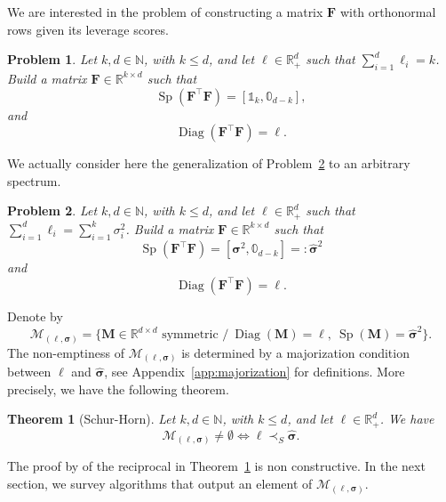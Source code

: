 \documentclass[twoside,11pt]{book}
\newtheorem{theorem}{Theorem}
\newtheorem{problem}{Problem}
\numberwithin{theorem}{chapter}
\numberwithin{definition}{chapter}
\numberwithin{proposition}{chapter}
\numberwithin{corollary}{chapter}
\numberwithin{example}{chapter}
\numberwithin{lemma}{chapter}
\DeclareMathOperator{\Sp}{\mathrm{Sp}}
\DeclareMathOperator{\Diag}{\mathrm{Diag}}
\DeclareMathOperator{\Tran}{\intercal}
\begin{document}
We are interested in the problem of constructing a matrix $\bm{F}$ with orthonormal rows given its leverage scores.
\begin{problem}\label{prob:orthogonal_frame_existence}
Let $k,d \in \mathbb{N}$, with $k \leq d$, and let $\bm{\ell} \in \mathbb{R}_{+}^{d}$ such that $\sum\limits_{i =1}^{d} \ell_{i} = k$. Build a matrix $\bm{F} \in \mathbb{R}^{k\times d}$ such that
\begin{equation}
\Sp(\bm{F}^{\Tran}\bm{F}) = [\mathbb{1}_{k},\mathbb{0}_{d-k}],
\end{equation}
and
\begin{equation}
\Diag(\bm{F}^{\Tran}\bm{F}) = \bm{\ell}.
\end{equation}
\end{problem}
We actually consider here the generalization of Problem~\ref{prob:general_frame_existence} to an arbitrary spectrum.

\begin{problem}\label{prob:general_frame_existence}
Let $k,d \in \mathbb{N}$, with $k \leq d$, and let $\bm{\ell} \in \mathbb{R}_{+}^{d}$ such that $\sum\limits_{i =1}^{d} \ell_{i} = \sum\limits_{i = 1}^{k} \sigma_{i}^2$. Build a matrix $\bm{F} \in \mathbb{R}^{k\times d}$ such that
\begin{equation}
\Sp(\bm{F}^{\Tran}\bm{F}) = [\bm{\sigma}^2,\mathbb{0}_{d-k}] =:\bm{\hat\sigma}^2
\end{equation}
and
\begin{equation}
\Diag(\bm{F}^{\Tran}\bm{F}) = \bm{\ell}.
\end{equation}
\end{problem}

Denote by
\begin{equation}
\mathcal{M}_{(\bm{\ell},\bm{\sigma})} =  \{ \bm{M} \in \mathbb{R}^{d\times d}\text{ symmetric } \big/~  \Diag(\bm{M}) = \bm{\ell}, ~\Sp(\bm{M}) = \bm{\hat{\sigma}}^2\}.
\end{equation}
The non-emptiness of $\mathcal{M}_{(\bm{\ell},\bm{\sigma})}$ is determined by a majorization condition between $\bm{\ell}$ and $\hat{\bm{\sigma}}$, see Appendix~\ref{app:majorization} for definitions. More precisely, we have the following theorem.
\begin{theorem}[Schur-Horn]\label{thm:majorization_equivalence}
Let $k,d \in \mathbb{N}$, with $k \leq d$, and let $\bm{\ell} \in \mathbb{R}_{+}^{d}$. We have
\begin{equation}\label{eq:nonemptiness_majorization_equivalence}
\mathcal{M}_{(\bm{\ell},\bm{\sigma})} \neq \emptyset \Leftrightarrow \bm{\ell} \prec_{S} \hat{\bm{\sigma}}.
\end{equation}
\end{theorem}
The proof by \cite{Hor54} of the reciprocal in Theorem~\ref{thm:majorization_equivalence} is non constructive. In the next section, we survey algorithms that output an element of $\mathcal{M}_{(\bm{\ell},\bm{\sigma})}$.
\end{document}

